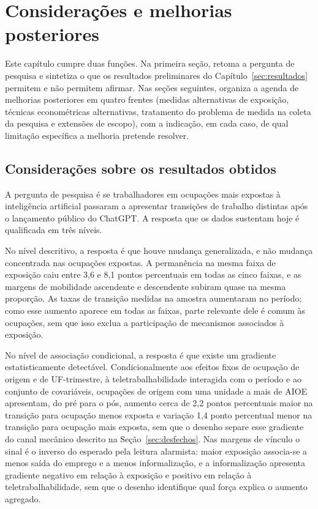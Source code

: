 \section{Considerações e melhorias posteriores}
\label{sec:melhorias}

Este capítulo cumpre duas funções. Na primeira seção, retoma a pergunta de
pesquisa e sintetiza o que os resultados preliminares do
Capítulo~\ref{sec:resultados} permitem e não permitem afirmar. Nas seções
seguintes, organiza a agenda de melhorias posteriores em quatro frentes
(medidas alternativas de exposição, técnicas econométricas alternativas,
tratamento do problema de medida na coleta da pesquisa e extensões de escopo),
com a indicação, em cada caso, de qual limitação específica a melhoria pretende
resolver.

\subsection{Considerações sobre os resultados obtidos}

A pergunta de pesquisa é se trabalhadores em ocupações mais expostas à
inteligência artificial passaram a apresentar transições de trabalho distintas
após o lançamento público do ChatGPT. A resposta que os dados sustentam hoje é
qualificada em três níveis.

No nível descritivo, a resposta é que houve mudança generalizada, e não
mudança concentrada nas ocupações expostas. A permanência na mesma faixa de
exposição caiu entre 3,6 e 8,1 pontos percentuais em todas as cinco faixas, e as
margens de mobilidade ascendente e descendente subiram quase na mesma proporção.
As taxas de transição medidas na amostra aumentaram no período; como esse
aumento aparece em todas as faixas, parte relevante dele é comum às ocupações,
sem que isso exclua a participação de mecanismos associados à exposição.

No nível de associação condicional, a resposta é que existe um gradiente estatisticamente detectável. Condicionalmente aos efeitos
fixos de ocupação de origem e de UF-trimestre, à teletrabalhabilidade interagida
com o período e ao conjunto de covariáveis, ocupações de origem com uma unidade
a mais de AIOE apresentam, do pré para o pós, aumento cerca de 2,2 pontos
percentuais maior na transição para ocupação menos exposta e variação 1,4 ponto
percentual menor na transição para ocupação mais exposta, sem que o desenho
separe esse gradiente do canal mecânico descrito na
Seção~\ref{sec:desfechos}. Nas margens de
vínculo o sinal é o inverso do esperado pela leitura alarmista: maior exposição
associa-se a menos saída do emprego e a menos informalização, e a informalização apresenta gradiente negativo em relação à exposição e
positivo em relação à teletrabalhabilidade, sem que o desenho identifique qual
força explica o aumento agregado.

